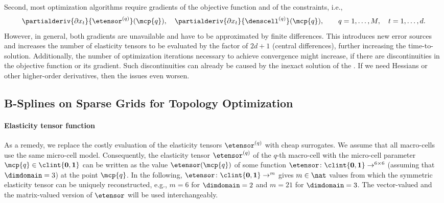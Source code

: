 Second, most optimization algorithms require gradients of the
objective function and of the constraints, i.e.,%
\begin{equation}
  \partialderiv{\partialdiff{} x_t}{\etensor^{(q)}}(\mcp{q}),\quad
  \partialderiv{\partialdiff{} x_t}{\denscell^{(q)}}(\mcp{q}),\qquad
  q = 1, \dotsc, M,\quad
  t = 1, \dotsc, d.
\end{equation}
However, in general, both gradients are unavailable and
have to be approximated by finite differences.
This introduces new error sources and
increases the number of elasticity tensors to be evaluated
by the factor of $2d + 1$ (central differences),
further increasing the time-to-solution.
Additionally, the number of optimization iterations necessary to
achieve convergence might increase,
if there are discontinuities in the objective function
or its gradient.
Such discontinuities can already be caused by the inexact solution of the \fem.
If we need Hessians or other higher-order derivatives,
then the issues even worsen.



\subsection{B-Splines on Sparse Grids for Topology Optimization}
\label{sec:622BSplines}

\paragraph{Elasticity tensor function}

As a remedy, we replace the costly evaluation of the
elasticity tensors $\etensor^{(q)}$ with cheap surrogates.
We assume that all macro-cells use the same micro-cell model.
Consequently, the elasticity tensor $\etensor^{(q)}$ of the $q$-th macro-cell
with the micro-cell parameter $\mcp{q} \in \clint{\*0, \*1}$
can be written as the value $\etensor(\mcp{q})$ of some function
$\etensor\colon \clint{\*0, \*1} \to \real^{6 \times 6}$
(assuming that $\dimdomain = 3$) at the point $\mcp{q}$.
In the following,
$\etensor\colon \clint{\*0, \*1} \to \real^m$
gives $m \in \nat$ values from which the symmetric elasticity tensor
can be uniquely reconstructed,
e.g., $m = 6$ for $\dimdomain = 2$ and $m = 21$ for $\dimdomain = 3$.
The vector-valued and the matrix-valued version of $\etensor$
will be used interchangeably.

